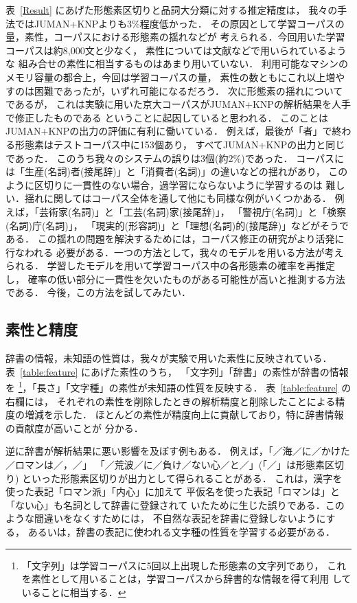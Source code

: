 表~\ref{Result} にあげた形態素区切りと品詞大分類に対する推定精度は，
我々の手法ではJUMAN+KNPよりも3\%程度低かった．
その原因として学習コーパスの量，素性，コーパスにおける形態素の揺れなどが
考えられる．今回用いた学習コーパスは約8,000文と少なく，
素性については文献\cite{Uchimoto:eacl99}などで用いられているような
組み合せの素性に相当するものはあまり用いていない．
利用可能なマシンのメモリ容量の都合上，今回は学習コーパスの量，
素性の数ともにこれ以上増やすのは困難であったが，いずれ可能になるだろう．
次に形態素の揺れについてであるが，
これは実験に用いた京大コーパスがJUMAN+KNPの解析結果を人手で修正したものである
ということに起因していると思われる．
このことはJUMAN+KNPの出力の評価に有利に働いている．
例えば，最後が「者」で終わる形態素はテストコーパス中に153個あり，
すべてJUMAN+KNPの出力と同じであった．
このうち我々のシステムの誤りは3個(約2\%)であった．
コーパスには「生産(名詞)者(接尾辞)」と「消費者(名詞)」の違いなどの揺れがあり，
このように区切りに一貫性のない場合，過学習にならないように学習するのは
難しい．揺れに関してはコーパス全体を通して他にも同様な例がいくつかある．
例えば，「芸術家(名詞)」と「工芸(名詞)家(接尾辞)」，
「警視庁(名詞)」と「検察(名詞)庁(名詞)」，
「現実的(形容詞)」と「理想(名詞)的(接尾辞)」などがそうである．
この揺れの問題を解決するためには，コーパス修正の研究がより活発に行なわれる
必要がある．一つの方法として，我々のモデルを用いる方法が考えられる．
学習したモデルを用いて学習コーパス中の各形態素の確率を再推定し，
確率の低い部分に一貫性を欠いたものがある可能性が高いと推測する方法である．
今後，この方法を試してみたい．

\vspace{2pt}
\subsection{素性と精度}
\label{sec:features_and_accuracy}

辞書の情報，未知語の性質は，我々が実験で用いた素性に反映されている．
表~\ref{table:feature} にあげた素性のうち，
「文字列」「辞書」の素性が辞書の情報を
\footnote{
「文字列」は学習コーパスに5回以上出現した形態素の文字列であり，
  これを素性として用いることは，学習コーパスから辞書的な情報を得て利用
  していることに相当する．
}，「長さ」「文字種」の素性が未知語の性質を反映する．
表~\ref{table:feature} の右欄には，
それぞれの素性を削除したときの解析精度と削除したことによる精度の増減を示した．
ほとんどの素性が精度向上に貢献しており，特に辞書情報の貢献度が高いことが
分かる．

逆に辞書が解析結果に悪い影響を及ぼす例もある．
例えば，「／海／に／かけた／ロマンは／，／」
「／荒波／に／負け／ない心／と／」(「／」は形態素区切り)
といった形態素区切りが出力として得られることがある．
これは，漢字を使った表記「ロマン派」「内心」に加えて
平仮名を使った表記「ロマンは」と「ない心」も名詞として辞書に登録されて
いたために生じた誤りである．このような間違いをなくすためには，
不自然な表記を辞書に登録しないようにする，
あるいは，辞書の表記に使われる文字種の性質を学習する必要がある．

